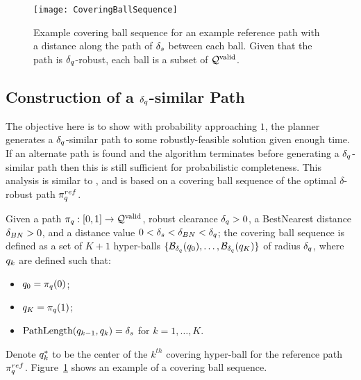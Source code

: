 

\begin{figure}
    \centering
    \texttt{[image: CoveringBallSequence]}
    \caption{Example covering ball sequence for an example reference path with a distance along the path of $\delta_s$ between each ball. Given that the path is $\delta_q$-robust, each ball is a subset of $\mathcal{Q}^{\textrm{valid}}$.}
    \label{fig:covering_ball_sequence}
\end{figure}


\subsection{Construction of a $\delta_q$-similar Path}
\label{sec:delta_sim_traj_construction}

The objective here is to show with probability approaching $1$, the planner generates a $\delta_q$-similar path to some robustly-feasible solution given enough time.  If an alternate path is found and the algorithm terminates before generating a $\delta_q$-similar path then this is still sufficient for probabilistic completeness.  This analysis is similar to \cite{LiAOKP2016}, and is based on a covering ball sequence of the optimal  $\delta$-robust path $\pi_{q}^{ref}$.

\begin{definition}
    \label{def:coveringballseq}
    Given a path $\pi_{q} : [0, 1] \rightarrow \mathcal{Q}^{\textrm{valid}}$, robust clearance $\delta_q > 0$, a BestNearest distance $\delta_{BN} > 0$, and a distance value $0 < \delta_s < \delta_{BN} < \delta_q$; the covering ball sequence is defined as a set of $K + 1$ hyper-balls $\{ \mathcal{B}_{\delta_q}(q_0), \dots, \mathcal{B}_{\delta_q}(q_K) \}$ of radius $\delta_q$, where $q_k$ are defined such that:
    \begin{itemize}
        \item $q_0 = \pi_{q}(0)$;
        \item $q_K = \pi_{q}(1)$;
        \item $\textup{PathLength}(q_{k-1}, q_k) = \delta_s$ for $k = 1, \dots, K$.
    \end{itemize}
\end{definition}
\noindent
Denote $q^*_k$ to be the center of the $k^{th}$ covering hyper-ball for the reference path $\pi_{q}^{ref}$. Figure~\ref{fig:covering_ball_sequence} shows an example of a covering ball sequence.


